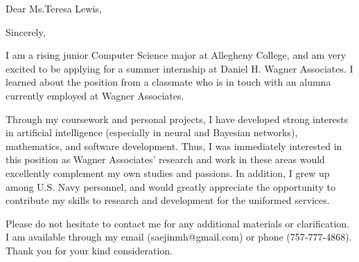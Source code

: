 \documentclass[11pt,a4paper,sans]{moderncv}        %
\begin{document}
\date{April 1, 2017}
\opening{Dear Ms.\hspace{0.62mm}Teresa Lewis,}
\closing{Sincerely,}
\makelettertitle

\justify
I am a rising junior Computer Science major at Allegheny College, and am very excited to be applying for a summer internship at Daniel H. Wagner Associates. I learned about the position from a classmate who is in touch with an alumna currently employed at Wagner Associates.

Through my coursework and personal projects, I have developed strong interests in artificial intelligence (especially in neural and Bayesian networks), mathematics, and software development. Thus, I was immediately interested in this position as Wagner Associates' research and work in these areas would excellently complement my own studies and passions. In addition, I grew up among U.S. Navy personnel, and would greatly appreciate the opportunity to contribute my skills to research and development for the uniformed services.

Please do not hesitate to contact me for any additional materials or clarification. I am available through my email (saejinmh@gmail.com) or phone (757-777-4868). Thank you for your kind consideration.
\newline\newline


\makeletterclosing
\end{document}
